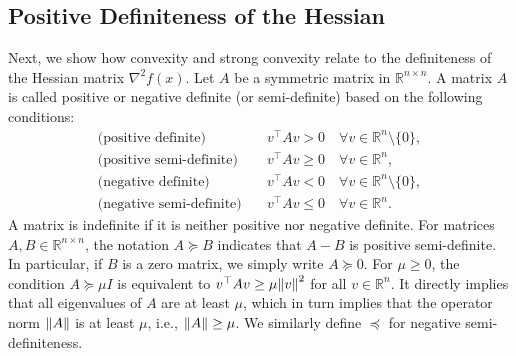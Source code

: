 \documentclass[0_en]{subfiles}
\begin{document}
\subsection{Positive Definiteness of the Hessian}

Next, we show how convexity and strong convexity relate to the definiteness of the Hessian matrix $\nabla^2 f(x)$.
Let $A$ be a symmetric matrix in $\mathbb{R}^{n \times n}$. A matrix $A$ is called positive or negative definite (or semi-definite) based on the following conditions:
\begin{align*}
    \text{(positive definite)} \quad      & v^\top A v > 0 \quad \forall v \in \mathbb{R}^n \setminus \{0\}, \\
    \text{(positive semi-definite)} \quad & v^\top A v \ge 0 \quad \forall v \in \mathbb{R}^n,               \\
    \text{(negative definite)} \quad      & v^\top A v < 0 \quad \forall v \in \mathbb{R}^n \setminus \{0\}, \\
    \text{(negative semi-definite)} \quad & v^\top A v \le 0 \quad \forall v \in \mathbb{R}^n.
\end{align*}
A matrix is indefinite if it is neither positive nor negative definite.
For matrices $A,B \in \mathbb{R}^{n \times n}$, the notation $A \succeq B$ indicates that $A-B$ is positive semi-definite.
In particular, if $B$ is a zero matrix, we simply write $A \succeq 0$.
For $\mu \geq 0$, the condition $A \succeq \mu I$ is equivalent to $v^\top A v \ge \mu \norm{v}^2$ for all $v \in \mathbb{R}^n$.
It directly implies that all eigenvalues of $A$ are at least $\mu$, which in turn implies that the operator norm $\norm{A}$ is at least $\mu$, i.e., $\norm{A} \geq \mu$.
We similarly define $\preceq$ for negative semi-definiteness.
\end{document}
